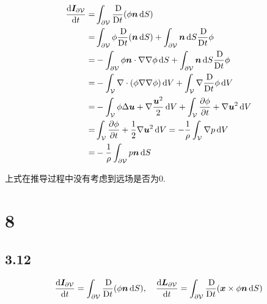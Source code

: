 \documentclass[12pt]{article}
\begin{document}
\begin{equation}
	\begin{aligned}
		\frac{\dif \boldsymbol{I}_{\partial \mathcal{V}}}{\dif t}=&\int_{\partial \mathcal{V}} \frac{\Dif}{\Dif t}(\phi \boldsymbol{n} \dif S)\\
		=&\int_{\partial \mathcal{V}} \phi\frac{\Dif}{\Dif t}( \boldsymbol{n} \dif S) + \int_{\partial \mathcal{V}} \boldsymbol{n} \dif S\frac{\Dif}{\Dif t}\phi \\
		=&-\int_{\partial \mathcal{V}} \phi \bm{n} \cdot \nabla\nabla \phi \dif S + \int_{\partial \mathcal{V}} \boldsymbol{n} \dif S\frac{\Dif}{\Dif t}\phi \\
		=&-\int_{ \mathcal{V}} \nabla \cdot (\phi \nabla\nabla \phi) \dif V  + \int_{ \mathcal{V}} \nabla \frac{\Dif}{\Dif t}\phi \dif V \\
		=&-\int_{ \mathcal{V}} \phi \Delta \bm{u} +\nabla \frac{\bm{u}^2}{2} \dif V  + \int_{ \mathcal{V}} \frac{\partial \phi }{\partial t} + \nabla\bm{u}^2 \dif V \\
		=& \int_{ \mathcal{V}} \frac{\partial \phi }{\partial t} + \frac{1}{2} \nabla\bm{u}^2 \dif V =- \frac{1}{\rho} \int_{ \mathcal{V}} \nabla p \dif V \\
		=&- \frac{1}{\rho} \int_{\partial \mathcal{V}}  p \bm{n} \dif S \\
	\end{aligned}
\end{equation}

上式在推导过程中没有考虑到远场是否为0.

\section{8}

\subsection{3.12}

\begin{equation}
	\frac{\dif \boldsymbol{I}_{\partial \mathcal{V}}}{\dif t}=\int_{\partial \mathcal{V}} \frac{\Dif}{\Dif t}(\phi \boldsymbol{n} \dif S), \quad \frac{\dif \boldsymbol{L}_{\partial \mathcal{V}}}{\dif t}=\int_{\partial \mathcal{V}} \frac{\Dif}{\Dif t}(\boldsymbol{x} \times \phi \boldsymbol{n} \dif S)
\end{equation}
\end{document}
